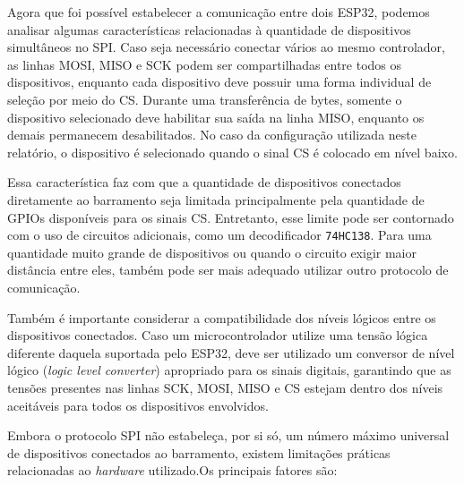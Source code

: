 \documentclass[a4paper,oneside,10pt]{article}
\begin{document}
Agora que foi possível estabelecer a comunicação entre dois ESP32, podemos analisar algumas características relacionadas à quantidade de dispositivos simultâneos no SPI. Caso seja necessário conectar vários ao mesmo controlador, as linhas MOSI, MISO e SCK podem ser compartilhadas entre todos os dispositivos, enquanto cada dispositivo deve possuir uma forma individual de seleção por meio do CS. Durante uma transferência de bytes, somente o dispositivo selecionado deve habilitar sua saída na linha MISO, enquanto os demais permanecem desabilitados. No caso da configuração utilizada neste relatório, o dispositivo é selecionado quando o sinal CS é colocado em nível baixo.
\par
Essa característica faz com que a quantidade de dispositivos conectados diretamente ao barramento seja limitada principalmente pela quantidade de GPIOs disponíveis para os sinais CS. Entretanto, esse limite pode ser contornado com o uso de circuitos adicionais, como um decodificador \texttt{74HC138}. Para uma quantidade muito grande de dispositivos ou quando o circuito exigir maior distância entre eles, também pode ser mais adequado utilizar outro protocolo de comunicação.
\par
Também é importante considerar a compatibilidade dos níveis lógicos entre os dispositivos conectados. Caso um microcontrolador utilize uma tensão lógica diferente daquela suportada pelo ESP32, deve ser utilizado um conversor de nível lógico (\textit{logic level converter}) apropriado para os sinais digitais, garantindo que as tensões presentes nas linhas SCK, MOSI, MISO e CS estejam dentro dos níveis aceitáveis para todos os dispositivos envolvidos.
\par
Embora o protocolo SPI não estabeleça, por si só, um número máximo universal de dispositivos conectados ao barramento, existem limitações práticas relacionadas ao \textit{hardware} utilizado.Os principais fatores são:
\end{document}
